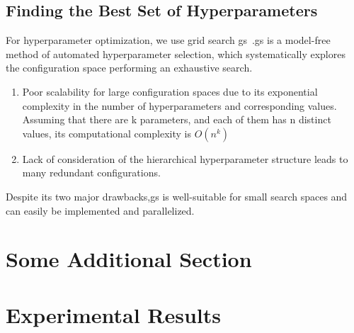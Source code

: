\subsection{Finding the Best Set of Hyperparameters}
\label{sec:implement:setup: gridsearch}
For hyperparameter optimization, we use grid search \ac{gs}~\cite{Lorenzo2017,Yang2020,Zoeller2021}.\Ac{gs} is a model-free method of automated hyperparameter selection, which systematically explores the configuration space performing an exhaustive search.
\begin{enumerate}
    \item Poor scalability for large configuration spaces due to its exponential complexity in the number of hyperparameters and corresponding values. Assuming that there are k parameters, and each of them has n distinct values, its computational complexity is $O(n^{k})$
    \item Lack of consideration of the hierarchical hyperparameter structure leads to many redundant configurations.
\end{enumerate}
Despite its two major drawbacks,\ac{gs} is well-suitable for small search spaces and can easily be implemented and parallelized.


\section{Some Additional Section}
%
\section{Experimental Results}
\label{sec:eval:results}

